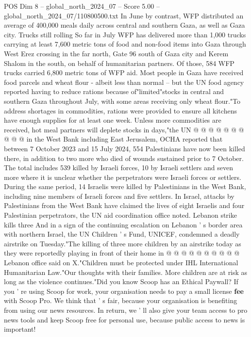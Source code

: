 \begin{textsample}{POS Dim 8 – global\_north\_2024\_07 – Score 5.00 – global\_north\_2024\_07/110800500.txt}
In June by contrast, WFP distributed an average of 400,000 meals daily across central and southern Gaza, as well as Gaza city.
Trucks still rolling So far in July WFP has delivered more than 1,000 trucks carrying at least 7,600 metric tons of food and non-food items into Gaza through West Erez crossing in the far north, Gate 96 south of Gaza city and Kerem Shalom in the south, on behalf of humanitarian partners.
Of those, 584 WFP trucks carried 6,800 metric tons of WFP aid.
Most people in Gaza have received food parcels and wheat flour - albeit less than normal -- but the UN food agency reported having to reduce rations because of"limited"stocks in central and southern Gaza throughout July, with some areas receiving only wheat flour."To address shortages in commodities, rations were provided to ensure all kitchens have enough supplies for at least one week.
Unless more commodities are received, hot meal partners will deplete stocks in days,"the UN @ @ @ @ @ @ @ @ @ @ in the West Bank including East Jerusalem, OCHA reported that between 7 October 2023 and 15 July 2024, 554 Palestinians have now been killed there, in addition to two more who died of wounds sustained prior to 7 October.
The total includes 539 killed by Israeli forces, 10 by Israeli settlers and seven more where it is unclear whether the perpetrators were Israeli forces or settlers.
During the same period, 14 Israelis were killed by Palestinians in the West Bank, including nine members of Israeli forces and five settlers.
In Israel, attacks by Palestinians from the West Bank have claimed the lives of eight Israelis and four Palestinian perpetrators, the UN aid coordination office noted.
Lebanon strike kills three And in a sign of the continuing escalation on Lebanon ' s border area with northern Israel, the UN Children ' s Fund, UNICEF, condemned a deadly airstrike on Tuesday."The killing of three more children by an airstrike today as they were reportedly playing in front of their home in @ @ @ @ @ @ @ @ @ @ Lebanon office said on X."Children must be protected under IHL International Humanitarian Law."Our thoughts with their families.
More children are at risk as long as the violence continues."Did you know Scoop has an Ethical Paywall?
If you ' re using Scoop for work, your organisation needs to pay a small license \textbf{fee} with Scoop Pro.
We think that ' s fair, because your organisation is benefiting from using our news resources.
In return, we ' ll also give your team access to pro news tools and keep Scoop free for personal use, because public access to news is important!

\end{textsample}

